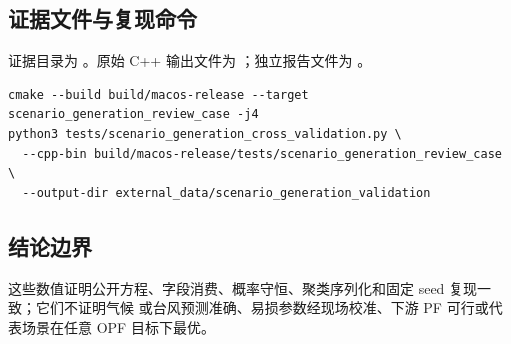 \subsection{证据文件与复现命令}
证据目录为 。原始 C++ 输出文件为
；独立报告文件为
。
\begin{verbatim}
cmake --build build/macos-release --target scenario_generation_review_case -j4
python3 tests/scenario_generation_cross_validation.py \
  --cpp-bin build/macos-release/tests/scenario_generation_review_case \
  --output-dir external_data/scenario_generation_validation
\end{verbatim}

\subsection{结论边界}
这些数值证明公开方程、字段消费、概率守恒、聚类序列化和固定 seed 复现一致；它们不证明气候
或台风预测准确、易损参数经现场校准、下游 PF 可行或代表场景在任意 OPF 目标下最优。

